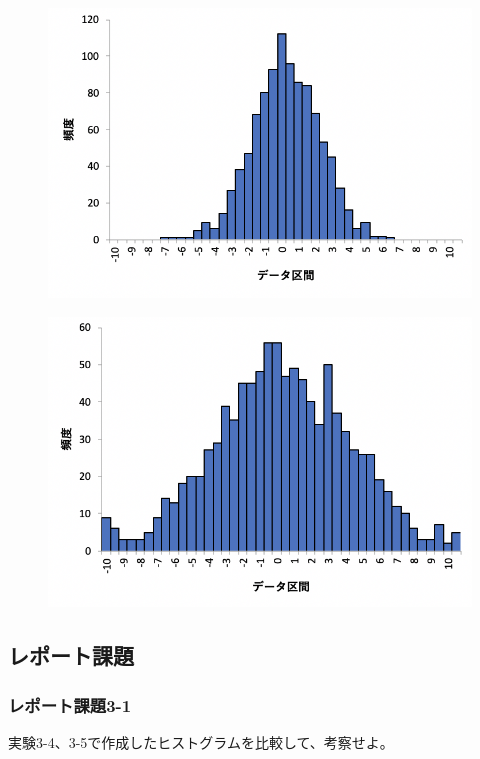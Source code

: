 \documentclass[12pt]{jarticle}
\begin{document}
\begin{figure}[h]
    \begin{center}
        \includegraphics[scale=0.6]{kadai4_3graph4.png}
    \end{center}
    \caption{}
\end{figure}
\clearpage
\begin{figure}[t]
    \begin{center}
        \includegraphics[scale=0.6]{kadai4_3graph5.png}
    \end{center}
    \caption{}
\end{figure}

\subsection{レポート課題}
\subsubsection*{レポート課題3-1}
\begin{shadebox}
    実験3-4、3-5で作成したヒストグラムを比較して、考察せよ。
\end{shadebox}
\end{document}
